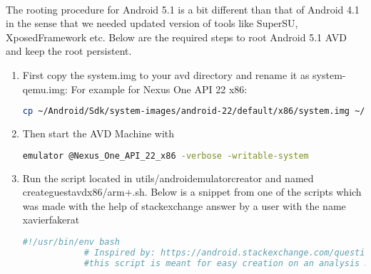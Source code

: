 \documentclass[../main.tex]{subfile}
\begin{document}
		\paragraph{} The rooting procedure for Android 5.1 is a bit different than that of Android 4.1 in the sense that we needed updated version of tools like SuperSU, XposedFramework etc. Below are the required steps to root Android 5.1 AVD and keep the root persistent.
		\begin{enumerate}
			\item First copy the system.img to your avd directory and rename it as system-qemu.img: For example for Nexus One API 22 x86: \newline 
			\begin{lstlisting}[language=bash]
			cp ~/Android/Sdk/system-images/android-22/default/x86/system.img ~/.android/avd/Nexus_One_API_22_x86.avd/system-qemu.img
			\end{lstlisting}
						
			
			\item Then start the AVD Machine with \newline 
			\begin{lstlisting}[language=bash]
			emulator @Nexus_One_API_22_x86 -verbose -writable-system
			\end{lstlisting}
						
			
			\item Run the script located in utils/android\textunderscore emulator\textunderscore creator and named create\textunderscore guest\textunderscore avd\textunderscore x86/arm+.sh. Below is a snippet from one of the scripts which was made with the help of stackexchange answer by a user with the name xavier\textunderscore fakerat \cite{android_emulator_7.1_root_stackexchange} \newline
			\begin{lstlisting}[language=bash]
			#!/usr/bin/env bash
			# Inspired by: https://android.stackexchange.com/questions/171442/root-android-virtual-device-with-android-7-1-1/176447
			#this script is meant for easy creation on an analysis machine for android emulator avd
			

\end{lstlisting}
\end{enumerate}
\end{document}
